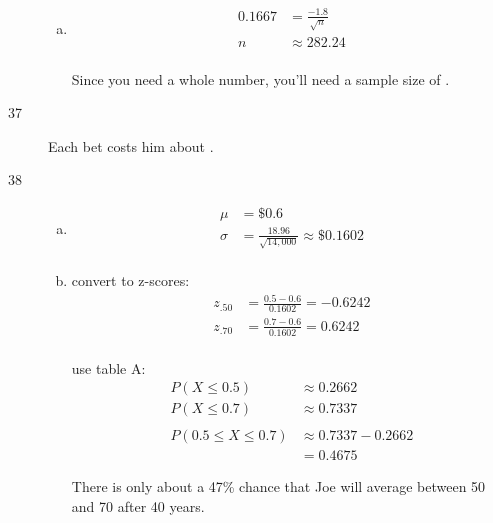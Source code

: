 \documentclass[letterpaper, landscape]{exam}
\newcommand{\cent}{\textcent\xspace}
\begin{document}
\begin{description}
\begin{enumerate}[(a)]
          \item 
            \begin{align*}
              0.1667 & = \frac{-1.8}{\sqrt{n}} \\
              n    & \approx 282.24 \\
            \end{align*}

            Since you need a whole number, you'll need a sample size of 
            .
        \end{enumerate}

      \item[37] Each bet costs him about \fbox{ 40\cent{} }.

      \item[38]
        \begin{enumerate}[(a)]
          \item 
            \begin{align*}
              \mu    & = \boxed{ \$0.6 } \\
              \sigma & = \frac{18.96}{\sqrt{14,000}} \approx \boxed{ \$0.1602 } \\
            \end{align*}
            
          \item
            convert to z-scores:
            \begin{align*}
              z_{.50} &= \frac{0.5 - 0.6}{0.1602} = -0.6242 \\
              z_{.70} &= \frac{0.7 - 0.6}{0.1602} = 0.6242 \\
            \end{align*}

            use table A:\@
            \begin{align*}
              P(X \leq 0.5) &\approx 0.2662 \\
              P(X \leq 0.7) &\approx 0.7337 \\
              \\
              P(0.5 \leq X \leq 0.7) & \approx 0.7337 - 0.2662 \\
                                     & = \boxed{ 0.4675 }
            \end{align*}

            There is only about a 47\% chance that Joe will average between
            50\cent{} and 70\cent{} after 40 years.

        \end{enumerate}


\end{description}
\end{document}
